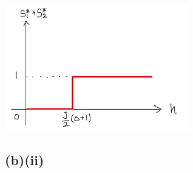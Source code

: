\documentclass[uplatex,a4j,11pt,dvipdfmx]{jsarticle}
\makeatletter
\def\fgcaption{\def\@captype{figure}\caption}
\makeatother
\begin{document}
\begin{center}
  \includegraphics[width=8cm]{mspec_dgeq0.png}
  \fgcaption{$\Delta\geq1$の場合の磁化の期待値}
\end{center}
\subsection*{(b)(ii)}

\end{document}
